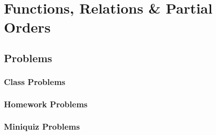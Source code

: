 \chapter{Functions, Relations \& Partial Orders}
\coursecopyright


\section{Problems}
\subsection{Class Problems}
%
%
%
%
\clearpage

\subsection{Homework Problems}
%
%
\clearpage

\subsection{Miniquiz Problems}
\clearpage

\endinput